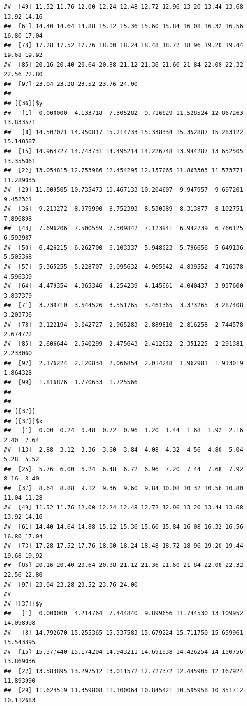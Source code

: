 \documentclass[
  ignorenonframetext,
]{beamer}
\begin{document}
\begin{frame}[fragile]{}
\begin{verbatim}
##  [49] 11.52 11.76 12.00 12.24 12.48 12.72 12.96 13.20 13.44 13.68 13.92 14.16
##  [61] 14.40 14.64 14.88 15.12 15.36 15.60 15.84 16.08 16.32 16.56 16.80 17.04
##  [73] 17.28 17.52 17.76 18.00 18.24 18.48 18.72 18.96 19.20 19.44 19.68 19.92
##  [85] 20.16 20.40 20.64 20.88 21.12 21.36 21.60 21.84 22.08 22.32 22.56 22.80
##  [97] 23.04 23.28 23.52 23.76 24.00
## 
## [[36]]$y
##   [1]  0.000000  4.133718  7.305282  9.716829 11.528524 12.867263 13.833571
##   [8] 14.507071 14.950817 15.214733 15.338334 15.352887 15.283122 15.148587
##  [15] 14.964727 14.743731 14.495214 14.226748 13.944287 13.652505 13.355061
##  [22] 13.054815 12.753986 12.454295 12.157065 11.863303 11.573771 11.289035
##  [29] 11.009505 10.735473 10.467133 10.204607  9.947957  9.697201  9.452321
##  [36]  9.213272  8.979990  8.752393  8.530389  8.313877  8.102751  7.896898
##  [43]  7.696206  7.500559  7.309842  7.123941  6.942739  6.766125  6.593987
##  [50]  6.426215  6.262700  6.103337  5.948023  5.796656  5.649136  5.505368
##  [57]  5.365255  5.228707  5.095632  4.965942  4.839552  4.716378  4.596339
##  [64]  4.479354  4.365346  4.254239  4.145961  4.040437  3.937600  3.837379
##  [71]  3.739710  3.644526  3.551765  3.461365  3.373265  3.287408  3.203736
##  [78]  3.122194  3.042727  2.965283  2.889810  2.816258  2.744578  2.674722
##  [85]  2.606644  2.540299  2.475643  2.412632  2.351225  2.291381  2.233060
##  [92]  2.176224  2.120834  2.066854  2.014248  1.962981  1.913019  1.864328
##  [99]  1.816876  1.770633  1.725566
## 
## 
## [[37]]
## [[37]]$x
##   [1]  0.00  0.24  0.48  0.72  0.96  1.20  1.44  1.68  1.92  2.16  2.40  2.64
##  [13]  2.88  3.12  3.36  3.60  3.84  4.08  4.32  4.56  4.80  5.04  5.28  5.52
##  [25]  5.76  6.00  6.24  6.48  6.72  6.96  7.20  7.44  7.68  7.92  8.16  8.40
##  [37]  8.64  8.88  9.12  9.36  9.60  9.84 10.08 10.32 10.56 10.80 11.04 11.28
##  [49] 11.52 11.76 12.00 12.24 12.48 12.72 12.96 13.20 13.44 13.68 13.92 14.16
##  [61] 14.40 14.64 14.88 15.12 15.36 15.60 15.84 16.08 16.32 16.56 16.80 17.04
##  [73] 17.28 17.52 17.76 18.00 18.24 18.48 18.72 18.96 19.20 19.44 19.68 19.92
##  [85] 20.16 20.40 20.64 20.88 21.12 21.36 21.60 21.84 22.08 22.32 22.56 22.80
##  [97] 23.04 23.28 23.52 23.76 24.00
## 
## [[37]]$y
##   [1]  0.000000  4.214764  7.444840  9.899656 11.744530 13.109952 14.098908
##   [8] 14.792670 15.255365 15.537583 15.679224 15.711750 15.659961 15.543395
##  [15] 15.377440 15.174204 14.943211 14.691938 14.426254 14.150756 13.869036
##  [22] 13.583895 13.297512 13.011572 12.727372 12.445905 12.167924 11.893990
##  [29] 11.624519 11.359808 11.100064 10.845421 10.595958 10.351712 10.112683

\end{verbatim}
\end{frame}
\end{document}

